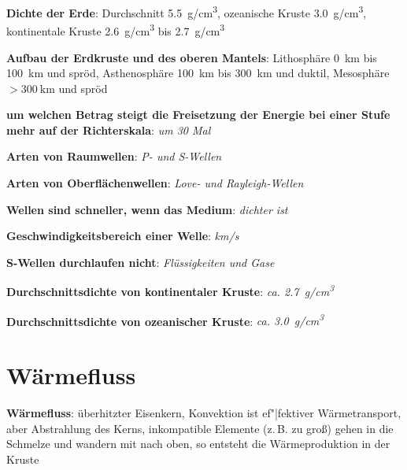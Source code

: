\textbf{Dichte der Erde}:
Durchschnitt \SI{5.5}{\gram/\centi\meter\cubed},
ozeanische Kruste \SI{3.0}{\gram/\centi\meter\cubed},
kontinentale Kruste \SI{2.6}{\gram/\centi\meter\cubed} bis \SI{2.7}{\gram/\centi\meter\cubed}

\textbf{Aufbau der Erdkruste und des oberen Mantels}:
Lithosphäre \SI{0}{\kilo\meter} bis \SI{100}{\kilo\meter} und spröd,
Asthenosphäre \SI{100}{\kilo\meter} bis \SI{300}{\kilo\meter} und duktil,
Mesosphäre $> \SI{300}{\kilo\meter}$ und spröd

\begin{wichtig}
    \item
    \textbf{um welchen Betrag steigt die Freisetzung der Energie bei einer Stufe mehr
    auf der Richterskala}:
    \emph{um 30 Mal}

    \item
    \textbf{Arten von Raumwellen}:
    \emph{P- und S-Wellen}

    \item
    \textbf{Arten von Oberflächenwellen}:
    \emph{Love- und Rayleigh-Wellen}

    \item
    \textbf{Wellen sind schneller, wenn das Medium}:
    \emph{dichter ist}

    \item
    \textbf{Geschwindigkeitsbereich einer Welle}:
    \emph{\si[math-rm=\mathit,text-rm=\itshape]{\kilo\meter/\second}}

    \item
    \textbf{S-Wellen durchlaufen nicht}:
    \emph{Flüssigkeiten und Gase}

    \item
    \textbf{Durchschnittsdichte von kontinentaler Kruste}:
    \emph{ca. \SI[math-rm=\mathit,text-rm=\itshape]{2.7}{\gram/\centi\meter^3}}

    \item
    \textbf{Durchschnittsdichte von ozeanischer Kruste}:
    \emph{ca. \SI[math-rm=\mathit,text-rm=\itshape]{3.0}{\gram/\centi\meter^3}}
\end{wichtig}

\pagebreak

\section{%
    Wärmefluss%
}

\textbf{Wärmefluss}:
überhitzter Eisenkern,
Konvektion ist ef"|fektiver Wärmetransport,
aber Abstrahlung des Kerns,
inkompatible Elemente (z.\,B. zu groß) gehen in die Schmelze und wandern mit nach oben,
so entsteht die Wärmeproduktion in der Kruste

